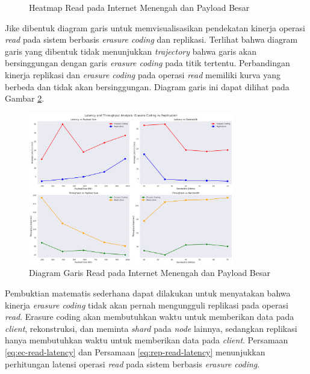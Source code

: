 \begin{enumerate}
\begin{figure}[ht]
    \caption{Heatmap Read pada Internet Menengah dan Payload Besar}
    \label{fig:read-bigload-avgnet-heatmap}
  \end{figure}

  Jike dibentuk diagram garis untuk memvisualisasikan pendekatan kinerja operasi \textit{read} pada sistem berbasis \textit{erasure coding} dan replikasi. Terlihat bahwa diagram garis yang dibentuk tidak menunjukkan \textit{trajectory} bahwa garis akan bersinggungan dengan garis \textit{erasure coding} pada titik tertentu. Perbandingan kinerja replikasi dan \textit{erasure coding} pada operasi \textit{read} memiliki kurva yang berbeda dan tidak akan bersinggungan. Diagram garis ini dapat dilihat pada Gambar \ref{fig:read-bigload-avgnet-line}.

  \begin{figure}[ht]
    \centering
    \includegraphics[width=0.8\textwidth]{resources/chapter-4/read_bigload_avgnet_line.png}

    \caption{Diagram Garis Read pada Internet Menengah dan Payload Besar}
    \label{fig:read-bigload-avgnet-line}
  \end{figure}

  Pembuktian matematis sederhana dapat dilakukan untuk menyatakan bahwa kinerja \textit{erasure coding} tidak akan pernah mengungguli replikasi pada operasi \textit{read}. Erasure coding akan membutuhkan waktu untuk memberikan data pada \textit{client}, rekonstruksi, dan meminta \textit{shard} pada \textit{node} lainnya, sedangkan replikasi hanya membutuhkan waktu untuk memberikan data pada \textit{client}. Persamaan \ref{eq:ec-read-latency} dan Persamaan \ref{eq:rep-read-latency} menunjukkan perhitungan latensi operasi \textit{read} pada sistem berbasis \textit{erasure coding}.


\end{enumerate}
